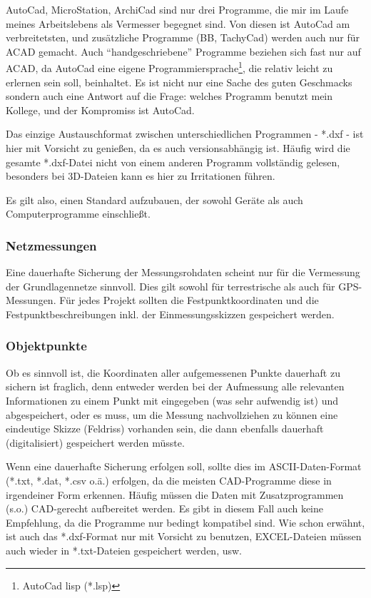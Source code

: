 AutoCad, MicroStation, ArchiCad sind nur drei Programme, die mir im Laufe meines Arbeitslebens als Vermesser begegnet sind. Von diesen ist AutoCad am verbreitetsten, und zusätzliche Programme (BB, TachyCad) werden auch nur für ACAD gemacht. Auch "`handgeschriebene"' Programme beziehen sich fast nur auf ACAD, da AutoCad eine eigene Programmiersprache\footnote{AutoCad lisp (*.lsp)}, die relativ leicht zu erlernen sein soll, beinhaltet. Es ist nicht nur eine Sache des guten Geschmacks sondern auch eine Antwort auf die Frage: welches Programm benutzt mein Kollege, und der Kompromiss ist AutoCad.

Das einzige Austauschformat zwischen unterschiedlichen Programmen - *.dxf - ist hier mit Vorsicht zu genießen, da es auch versionsabhängig ist. Häufig wird die gesamte *.dxf-Datei nicht von einem anderen Programm vollständig gelesen, besonders bei 3D-Dateien kann es hier zu Irritationen führen.

Es gilt also, einen Standard aufzubauen, der sowohl Geräte als auch Computerprogramme einschließt.

\subsubsection*{Netzmessungen}
Eine dauerhafte Sicherung der Messungsrohdaten scheint nur für die Vermessung der Grundlagennetze sinnvoll. Dies gilt sowohl für terrestrische als auch für GPS-Messungen. Für jedes Projekt sollten die Festpunktkoordinaten und die Festpunktbeschreibungen inkl. der Einmessungsskizzen gespeichert werden.

\subsubsection*{Objektpunkte}
Ob es sinnvoll ist, die Koordinaten aller aufgemessenen Punkte dauerhaft zu sichern ist fraglich, denn entweder werden bei der Aufmessung alle relevanten Informationen zu einem Punkt mit eingegeben (was sehr aufwendig ist) und abgespeichert, oder es muss, um die Messung nachvollziehen zu können eine eindeutige Skizze (Feldriss) vorhanden sein, die dann ebenfalls dauerhaft (digitalisiert) gespeichert werden müsste.

Wenn eine dauerhafte Sicherung erfolgen soll, sollte dies im ASCII-Daten-Format (*.txt, *.dat, *.csv o.ä.) erfolgen, da die meisten CAD-Programme diese in irgendeiner Form erkennen. Häufig müssen die Daten mit Zusatzprogrammen (s.o.) CAD-gerecht aufbereitet werden. Es gibt in diesem Fall auch keine Empfehlung, da die Programme nur bedingt kompatibel sind. Wie schon erwähnt, ist auch das *.dxf-Format nur mit Vorsicht zu benutzen, EXCEL-Dateien müssen auch wieder in *.txt-Dateien gespeichert werden, usw.

